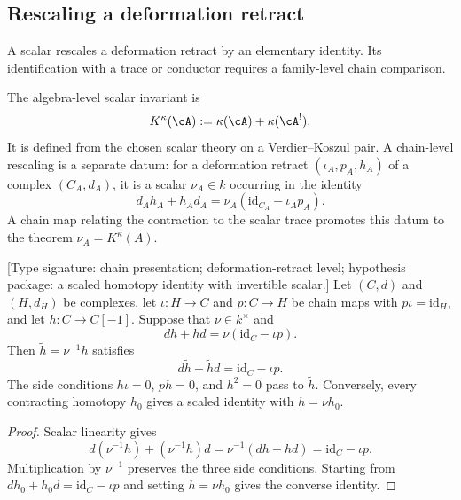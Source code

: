 \subsection{Rescaling a deformation retract}
\label{subsec:A-universal-chain-homotopy}

A scalar rescales a deformation retract by an elementary identity.
Its identification with a trace or conductor requires a family-level
chain comparison.

\begin{convention}
\label{conv:A-two-kappa-shriek}
%
The algebra-level scalar invariant is
\[
 K^\kappa(\cA):=\kappa(\cA)+\kappa(\cA^!).
\]
It is defined from the chosen scalar theory on a Verdier--Koszul pair.
A chain-level rescaling is a separate datum: for a deformation retract
$(\iota_A,p_A,h_A)$ of a complex $(C_A,d_A)$, it is a scalar
$\nu_A\in k$ occurring in the identity
\[
 d_Ah_A+h_Ad_A
 =\nu_A(\mathrm{id}_{C_A}-\iota_Ap_A).
\]
A chain map relating the contraction to the scalar trace promotes this
datum to the theorem $\nu_A=K^\kappa(A)$.
\end{convention}

\begin{proposition}
\label{prop:A-universal-chain-homotopy}
%
\textup{[Type signature: chain presentation; deformation-retract
level; hypothesis package: a scaled homotopy identity with invertible
scalar.]}
Let $(C,d)$ and $(H,d_H)$ be complexes, let
$\iota\colon H\to C$ and $p\colon C\to H$ be chain maps with
$p\iota=\mathrm{id}_H$, and let $h\colon C\to C[-1]$.  Suppose that
$\nu\in k^\times$ and
\[
 dh+hd=\nu(\mathrm{id}_C-\iota p).
\]
Then $\widetilde h=\nu^{-1}h$ satisfies
\[
 d\widetilde h+\widetilde h d=\mathrm{id}_C-\iota p.
\]
The side conditions $h\iota=0$, $ph=0$, and $h^2=0$ pass to
$\widetilde h$.  Conversely, every contracting homotopy $h_0$ gives a
scaled identity with $h=\nu h_0$.
\end{proposition}

\begin{proof}
Scalar linearity gives
\[
d(\nu^{-1}h)+(\nu^{-1}h)d
=\nu^{-1}(dh+hd)
=\mathrm{id}_C-\iota p.
\]
Multiplication by $\nu^{-1}$ preserves the three side conditions.
Starting from $dh_0+h_0d=\mathrm{id}_C-\iota p$ and setting
$h=\nu h_0$ gives the converse identity.
\end{proof}

